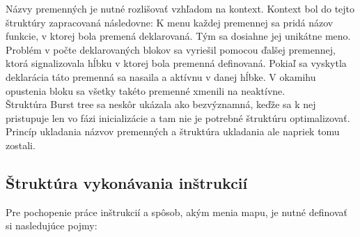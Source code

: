 Názvy premenných je nutné rozlišovať vzhľadom na kontext. Kontext bol do tejto štruktúry zapracovaná následovne: K menu každej premennej sa pridá názov funkcie, v ktorej bola premená deklarovaná. Tým sa dosiahne jej unikátne meno. Problém v počte deklarovaných blokov sa vyriešil pomocou ďalšej premennej, ktorá signalizovala hĺbku v ktorej bola premenná definovaná. Pokiaľ sa vyskytla deklarácia táto premenná sa nasaila a aktívnu v danej hĺbke. V okamihu opustenia bloku sa všetky takéto premenné xmenili na neaktívne. \\
Štruktúra Burst tree sa neskôr ukázala ako bezvýznamná, keďže sa k nej pristupuje len vo fázi inicializácie a tam nie je potrebné štruktúru optimalizovať. Princíp ukladania názvov premenných a štruktúra ukladania ale napriek tomu zostali. \\
\subsection{Štruktúra vykonávania inštrukcií}
Pre pochopenie práce inštrukcií a spôsob, akým menia mapu, je nutné definovať si nasledujúce pojmy:
